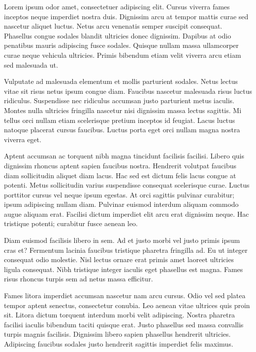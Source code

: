Lorem ipsum odor amet, consectetuer adipiscing elit. Cursus viverra fames inceptos neque imperdiet nostra duis. Dignissim arcu at tempor mattis curae sed nascetur aliquet luctus. Netus arcu venenatis semper suscipit consequat. Phasellus congue sodales blandit ultricies donec dignissim. Dapibus at odio penatibus mauris adipiscing fusce sodales. Quisque nullam massa ullamcorper curae neque vehicula ultricies. Primis bibendum etiam velit viverra arcu etiam sed malesuada ut.

Vulputate ad malesuada elementum et mollis parturient sodales. Netus lectus vitae sit risus netus ipsum congue diam. Faucibus nascetur malesuada risus luctus ridiculus. Suspendisse nec ridiculus accumsan justo parturient metus iaculis. Montes nulla ultricies fringilla nascetur nisi dignissim massa lectus sagittis. Mi tellus orci nullam etiam scelerisque pretium inceptos id feugiat. Lacus luctus natoque placerat cursus faucibus. Luctus porta eget orci nullam magna nostra viverra eget.

Aptent accumsan ac torquent nibh magna tincidunt facilisis facilisi. Libero quis dignissim rhoncus aptent sapien faucibus nostra. Hendrerit volutpat faucibus diam sollicitudin aliquet diam lacus. Hac sed est dictum felis lacus congue at potenti. Metus sollicitudin varius suspendisse consequat scelerisque curae. Luctus porttitor cursus vel neque ipsum egestas. At orci sagittis pulvinar curabitur; ipsum adipiscing nullam diam. Pulvinar euismod interdum aliquam commodo augue aliquam erat. Facilisi dictum imperdiet elit arcu erat dignissim neque. Hac tristique potenti; curabitur fusce aenean leo.

Diam euismod facilisis libero in sem. Ad et justo morbi vel justo primis ipsum cras et? Fermentum lacinia faucibus tristique pharetra fringilla ad. Eu ut integer consequat odio molestie. Nisl lectus ornare erat primis amet laoreet ultricies ligula consequat. Nibh tristique integer iaculis eget phasellus est magna. Fames risus rhoncus turpis sem ad netus massa efficitur.

Fames litora imperdiet accumsan nascetur nam arcu cursus. Odio vel sed platea tempor aptent senectus, consectetur conubia. Leo aenean vitae ultrices quis proin sit. Litora dictum torquent interdum morbi velit adipiscing. Nostra pharetra facilisi iaculis bibendum taciti quisque erat. Justo phasellus sed massa convallis turpis magnis facilisis. Dignissim libero sapien phasellus hendrerit ultricies. Adipiscing faucibus sodales justo hendrerit sagittis imperdiet felis maximus.
